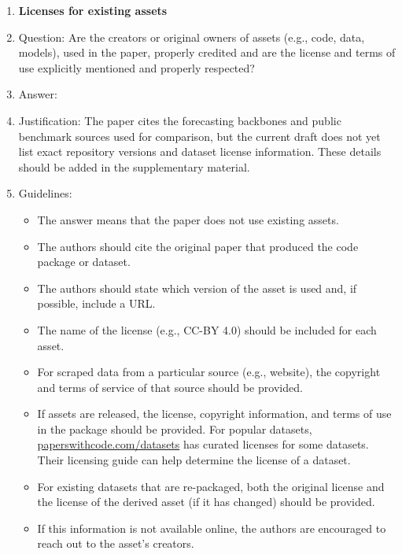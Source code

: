\begin{enumerate}
\item {\bf Licenses for existing assets}
    \item[] Question: Are the creators or original owners of assets (e.g., code, data, models), used in the paper, properly credited and are the license and terms of use explicitly mentioned and properly respected?
    \item[] Answer: \answerNo{}
    \item[] Justification: The paper cites the forecasting backbones and public benchmark sources used for comparison, but the current draft does not yet list exact repository versions and dataset license information. These details should be added in the supplementary material.
    \item[] Guidelines:
    \begin{itemize}
        \item The answer \answerNA{} means that the paper does not use existing assets.
        \item The authors should cite the original paper that produced the code package or dataset.
        \item The authors should state which version of the asset is used and, if possible, include a URL.
        \item The name of the license (e.g., CC-BY 4.0) should be included for each asset.
        \item For scraped data from a particular source (e.g., website), the copyright and terms of service of that source should be provided.
        \item If assets are released, the license, copyright information, and terms of use in the package should be provided. For popular datasets, \url{paperswithcode.com/datasets} has curated licenses for some datasets. Their licensing guide can help determine the license of a dataset.
        \item For existing datasets that are re-packaged, both the original license and the license of the derived asset (if it has changed) should be provided.
        \item If this information is not available online, the authors are encouraged to reach out to the asset's creators.
    \end{itemize}


\end{enumerate}
